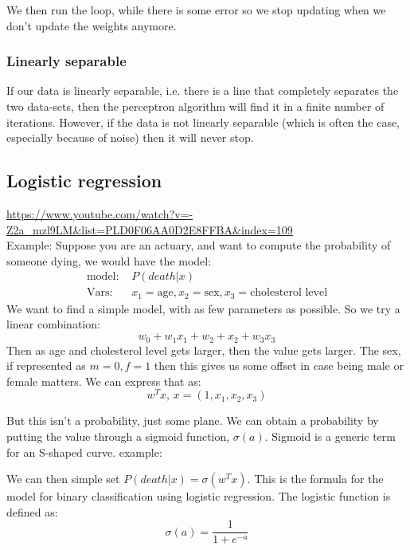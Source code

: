     We then run the loop, while there is some error so we stop updating when we 
    don't update the weights anymore.
    
    \subsubsection{Linearly separable}
    If our data is linearly separable, i.e. there is a line that completely 
    separates the two data-sets, then the perceptron algorithm will find it in 
    a finite number of iterations. However, if the data is not linearly 
    separable (which is often the case, especially because of noise) then it 
    will never stop.
    
    \subsection{Logistic regression}
    \url{https://www.youtube.com/watch?v=-Z2a_mzl9LM&list=PLD0F06AA0D2E8FFBA&index=109}\\
    Example: Suppose you are an actuary, and want to compute the probability of 
    someone dying, we would have the model:
    \begin{align*}
        \text{model: } &P(death|x)\\
        \text{Vars: } & x_1 = \text{age}, x_2 = \text{sex}, x_3 = 
        \text{cholesterol level}
    \end{align*}
    We want to find a simple model, with as few parameters as possible. So we 
    try a linear combination:
    \begin{equation*}
        w_0+w_1x_1+w_2+x_2+w_3x_3
    \end{equation*}
    Then as age and cholesterol level gets larger, then the value gets larger. 
    The sex, if represented as $m=0, f=1$ then this gives us some offset in 
    case being male or female matters. We can express that as:
    \begin{equation*}
        w^Tx,\, x=(1,x_1,x_2,x_3)
    \end{equation*}
    
    But this isn't a probability, just some plane. We can obtain a probability 
    by putting the value through a sigmoid function, $\sigma(a)$. Sigmoid is a 
    generic term for an S-shaped curve. example:
    \sigmoidPlot
    
    We can then simple set $P(death|x) = \sigma(w^Tx)$. This is the formula for 
    the model for binary classification using logistic regression. The logistic 
    function is defined as: 
    \begin{equation*}
        \sigma(a) = \frac{1}{1+e^{-a}}
    \end{equation*}
    
